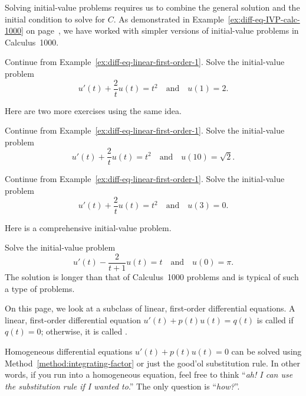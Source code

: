 \documentclass[../main.tex]{subfiles}
\begin{document}
Solving initial-value problems requires us to combine the general solution and the initial condition to solve for \(C\).  As demonstrated in Example~\ref{ex:diff-eq-IVP-calc-1000} on page~\pageref{ex:diff-eq-IVP-calc-1000}, we have worked with simpler versions of initial-value problems in Calculus~1000.

\begin{example} \label{ex:diff-eq-linear-first-first-order-1-ivp}
  Continue from Example~\ref{ex:diff-eq-linear-first-order-1}. Solve the initial-value problem 
  \[
    u'(t) + \frac{2}{t} u(t) = t^{2} \quad\text{and}\quad u(1) = 2.
  \]
\end{example}

Here are two more exercises using the same idea.
\begin{example}
  Continue from Example~\ref{ex:diff-eq-linear-first-order-1}. Solve the initial-value problem 
  \[
    u'(t) + \frac{2}{t} u(t) = t^{2} \quad\text{and}\quad u(10) = \sqrt{2}.
  \]
\end{example}

\begin{example}
  Continue from Example~\ref{ex:diff-eq-linear-first-order-1}. Solve the initial-value problem 
  \[
    u'(t) + \frac{2}{t} u(t) = t^{2} \quad\text{and}\quad u(3) = 0.
  \]
\end{example}
\clearpage

Here is a comprehensive initial-value problem.
\begin{example}
  Solve the initial-value problem
  \[
    u'(t) - \frac{2}{t+1} u(t) = t \quad\text{and}\quad u(0) = \pi.
  \]
  The solution is longer than that of Calculus~1000 problems and is typical of such a type of problems. 
\end{example}
\clearpage

On this page, we look at a subclass of linear, first-order differential equations. A linear, first-order differential equation \(u'(t) + p(t) u(t) = q(t)\) is called  if \(q(t) = 0\); otherwise, it is called .  

Homogeneous differential equations \(u'(t) + p(t) u(t) = 0\) can be solved using Method~\ref{method:integrating-factor} or just the good'ol substitution rule.  In other words, if you run into a homogeneous equation, feel free to think ``\emph{ah! I can use the substitution rule if I wanted to}.''  The only question is ``\emph{how?}''.
\end{document}
